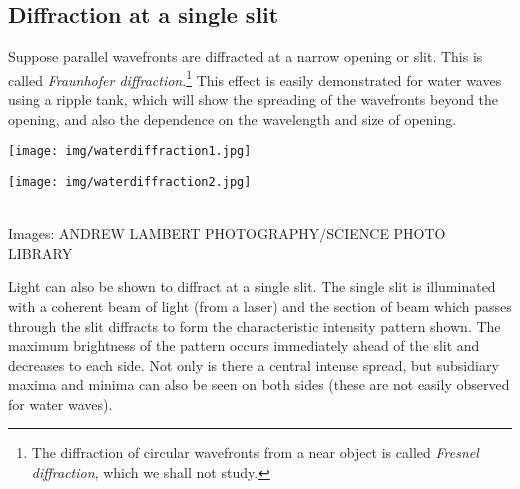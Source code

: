 \subsection{Diffraction at a single slit}

Suppose parallel wavefronts are diffracted at a narrow opening or slit.  This is called \emph{Fraunhofer diffraction}.\footnote{The diffraction of circular wavefronts from a near object is called \emph{Fresnel diffraction}, which we shall not study.}  This effect is easily demonstrated for water waves using a ripple tank, which will show the spreading of the wavefronts beyond the opening, and also the dependence on the wavelength and size of opening.

\vspace*{1em}

\begin{minipage}{0.45\textwidth}
\texttt{[image: img/waterdiffraction1.jpg]}
\end{minipage}
\begin{minipage}{0.45\textwidth}
\texttt{[image: img/waterdiffraction2.jpg]}
\end{minipage}\\
{\scriptsize Images: ANDREW LAMBERT PHOTOGRAPHY/SCIENCE PHOTO LIBRARY}

\vspace*{1em}

Light can also be shown to diffract at a single slit.  The single slit is illuminated with a coherent beam of light (from a laser) and the section of beam which passes through the slit diffracts to form the characteristic intensity pattern shown.  The maximum brightness of the pattern occurs immediately ahead of the slit and decreases to each side.  Not only is there a central intense spread, but subsidiary maxima and minima can also be seen on both sides (these are not easily observed for water waves).


